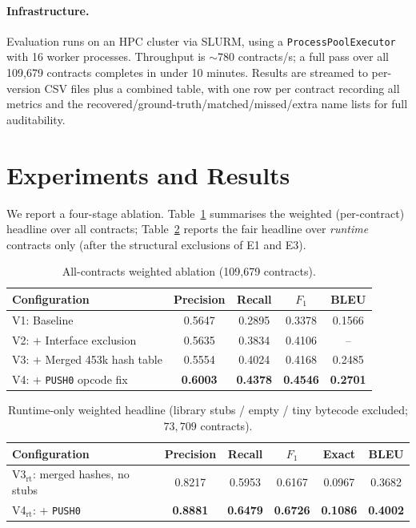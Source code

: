 \documentclass[10pt,conference]{article}
\begin{document}
\paragraph{Infrastructure.}
Evaluation runs on an HPC cluster via SLURM, using a \texttt{ProcessPoolExecutor}
with 16 worker processes. Throughput is $\sim$780 contracts/s; a full pass over
all 109{,}679 contracts completes in under 10 minutes. Results are streamed to
per-version CSV files plus a combined table, with one row per contract recording
all metrics and the recovered/ground-truth/matched/missed/extra name lists for
full auditability.

\section{Experiments and Results}

We report a four-stage ablation. Table~\ref{tab:ablation-all} summarises the
weighted (per-contract) headline over all contracts; Table~\ref{tab:ablation-rt}
reports the fair headline over \emph{runtime} contracts only (after the
structural exclusions of E1 and E3).

\begin{table}[t]
\centering
\caption{All-contracts weighted ablation (109{,}679 contracts).}
\label{tab:ablation-all}
\small
\begin{tabular}{l c c c c}
\toprule
Configuration & Precision & Recall & $F_1$ & BLEU \\
\midrule
V1: Baseline                     & 0.5647 & 0.2895 & 0.3378 & 0.1566 \\
V2: + Interface exclusion        & 0.5635 & 0.3834 & 0.4106 & --     \\
V3: + Merged 453k hash table     & 0.5554 & 0.4024 & 0.4168 & 0.2485 \\
V4: + \texttt{PUSH0} opcode fix  & \textbf{0.6003} & \textbf{0.4378} & \textbf{0.4546} & \textbf{0.2701} \\
\bottomrule
\end{tabular}
\end{table}

\begin{table}[t]
\centering
\caption{Runtime-only weighted headline (library stubs / empty / tiny bytecode
excluded; $73{,}709$ contracts).}
\label{tab:ablation-rt}
\small
\begin{tabular}{l c c c c c}
\toprule
Configuration & Precision & Recall & $F_1$ & Exact & BLEU \\
\midrule
V3$_{\text{rt}}$: merged hashes, no stubs & 0.8217 & 0.5953 & 0.6167 & 0.0967 & 0.3682 \\
V4$_{\text{rt}}$: + \texttt{PUSH0}        & \textbf{0.8881} & \textbf{0.6479} & \textbf{0.6726} & \textbf{0.1086} & \textbf{0.4002} \\
\bottomrule
\end{tabular}
\end{table}
\end{document}
